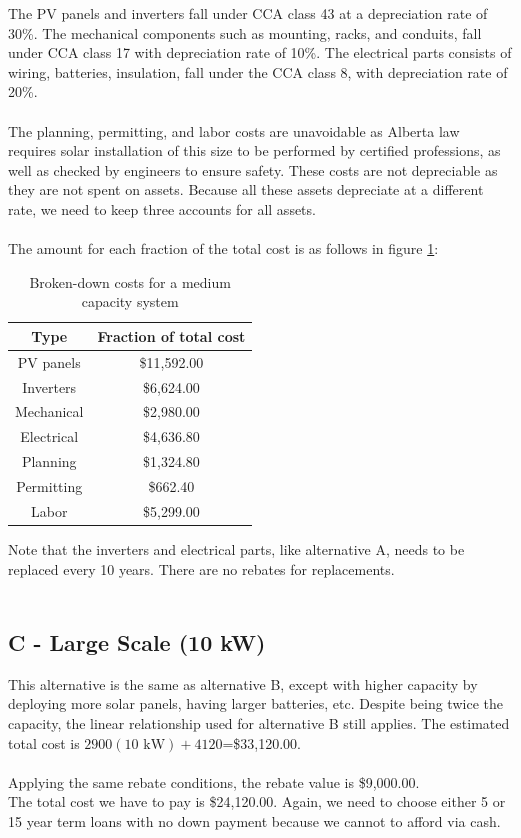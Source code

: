 \documentclass[10pt,letterpaper]{article}
\begin{document}
The PV panels and inverters fall under CCA class 43 at a depreciation rate of 30\%. The mechanical components such as mounting, racks, and conduits, fall under CCA class 17 with depreciation rate of 10\%. The electrical parts consists of wiring, batteries, insulation, fall under the CCA class 8, with depreciation rate of 20\%.\\
\\
The planning, permitting, and labor costs are unavoidable as Alberta law requires solar installation of this size to be performed by certified professions, as well as checked by engineers to ensure safety. These costs are not depreciable as they are not spent on assets. Because all these assets depreciate at a different rate, we need to keep three accounts for all assets.\\
\\
The amount for each fraction of the total cost is as follows in figure \ref{fig:medium-cost-breakdown}:\\

\begin{table}[H]
	\centering
	\begin{tabular}{|c|c|}
		\hline
		Type&Fraction of total cost\\
		\hline
		PV panels&\$11,592.00\\
		Inverters&\$6,624.00\\
		Mechanical&\$2,980.00\\
		Electrical&\$4,636.80\\
		Planning&\$1,324.80\\
		Permitting&\$662.40\\
		Labor&\$5,299.00\\
		\hline
	\end{tabular}
	\caption{Broken-down costs for a medium capacity system}
	\label{fig:medium-cost-breakdown}
\end{table}

Note that the inverters and electrical parts, like alternative A, needs to be replaced every 10 years. There are no rebates for replacements.\\
\\

\subsection{C - Large Scale (10 kW)}

This alternative is the same as alternative B, except with higher capacity by deploying more solar panels, having larger batteries, etc. Despite being twice the capacity, the linear relationship used for alternative B still applies. The estimated total cost is $2900(\text{10 kW})+4120$=\$33,120.00.\\
\\
Applying the same rebate conditions, the rebate value is \$9,000.00.\\ The total cost we have to pay is \$24,120.00. Again, we need to choose either 5 or 15 year term loans with no down payment because we cannot to afford via cash.\\
\end{document}
